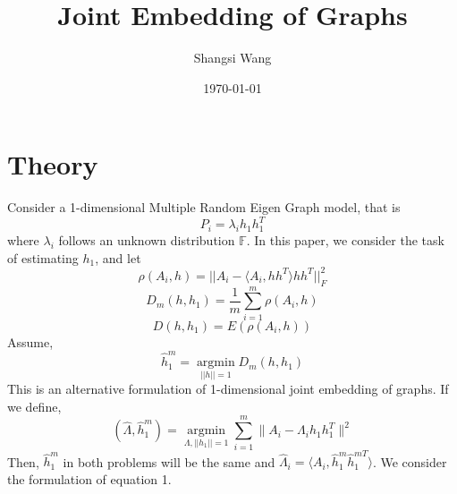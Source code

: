 \documentclass[a4paper]{article}
\title{Joint Embedding of Graphs}
\author{Shangsi Wang}
\date{\today}
\begin{document}
\maketitle





\section{Theory}
Consider a 1-dimensional Multiple Random Eigen Graph model, that is 
\[P_i=\lambda_i h_1 h_1 ^T\]
where $\lambda_i$ follows an unknown distribution $\mathbb{F}$. In this paper, we consider the task of estimating $h_1$, and let
\[ \rho(A_i,h)= ||A_i- \langle A_i,h h^T \rangle h h^T||_F^2 \]
\[ D_m(h,h_1) =\frac{1}{m}\sum_{i=1}^{m} \rho(A_i,h) \]
\[ D(h,h_1) = E(\rho(A_i,h)) \]
Assume, 
\begin{equation} 
\hat{h}_1^m= \underset{||h|| =1}{\operatorname{argmin}}   D_m(h,h_1)
\end{equation}
This is an alternative formulation of 1-dimensional joint embedding of graphs. If we define,
\[(\hat{\Lambda},\hat{h}_1^m) = \underset{\Lambda,||h_1||=1}{\operatorname{argmin}} \sum\limits_{i=1}^{m} \| A_i-  \Lambda_{i} h_1 h_1^T \|  ^2 \]
Then, $\hat{h}_1^m$ in both problems will be the same and $\hat{\Lambda}_{i}=\langle A_i,\hat{h}_1^m \hat{h}_1^{mT} \rangle$. We consider the formulation of equation 1. 
\end{document}
